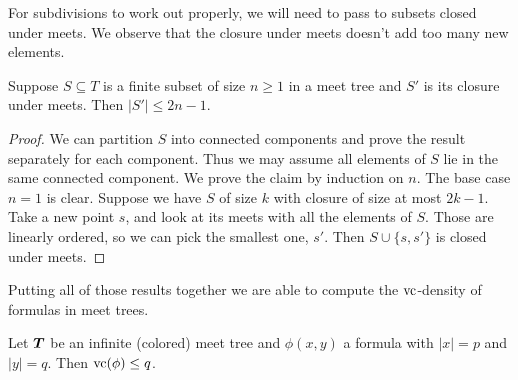 \documentclass{amsart}
\DeclareMathOperator{\TT}{\boldface T}
\begin{document}
For subdivisions to work out properly, we will need to pass to subsets closed under meets. We observe that the closure under meets doesn't add too many new elements.

\begin{Lemma} \label{lm_meet}
  Suppose $S \subseteq T$ is a finite subset of size $n \geq 1$ in a meet tree and $S'$ is its closure under meets. Then $|S'| \leq 2n - 1$.
\end{Lemma}
\begin{proof}
  We can partition $S$ into connected components and prove the result separately for each component. Thus we may assume all elements of $S$ lie in the same connected component. We prove the claim by induction on $n$. The base case $n = 1$ is clear. Suppose we have $S$ of size $k$ with closure of size at most $2k - 1$. Take a new point $s$, and look at its meets with all the elements of $S$.
  Those are linearly ordered, so we can pick the smallest one, $s'$.
  Then $S \cup \{s, s'\}$ is closed under meets.
\end{proof}

Putting all of those results together we are able to compute the $\operatorname{vc}$-density of formulas in meet trees.

\begin{Theorem}
  Let $\TT$ be an infinite (colored) meet tree and $\phi(x, y)$ a formula with $|x| = p$ and $|y| = q$. Then $\operatorname{vc}(\phi) \leq q$.
\end{Theorem}
\end{document}
